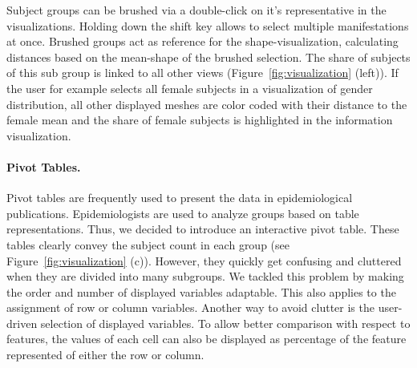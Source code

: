 \documentclass[journal]{style/vgtc} 			          %
\begin{document}
Subject groups can be brushed via a double-click on it's representative in the visualizations.
%
Holding down the shift key allows to select multiple manifestations at once.
%
Brushed groups act as reference for the shape-visualization, calculating distances based on the mean-shape of the brushed selection.
%
The share of subjects of this sub group is linked to all other views (Figure~\ref{fig:visualization} (left)).
%
If the user for example selects all female subjects in a visualization of gender distribution, all other displayed meshes are color coded with their distance to the female mean and the share of female subjects is highlighted in the information visualization.
%

\paragraph{Pivot Tables.}
Pivot tables are frequently used to present the data in epidemiological publications.
%
Epidemiologists are used to analyze groups based on table representations.
%
Thus, we decided to introduce an interactive pivot table.
%
These tables clearly convey the subject count in each group (see Figure~\ref{fig:visualization} (c)).
%
However, they quickly get confusing and cluttered when they are divided into many subgroups.
%
We tackled this problem by making the order and number of displayed variables adaptable.
%
This also applies to the assignment of row or column variables.
%
Another way to avoid clutter is the user-driven selection of displayed variables.
%
To allow better comparison with respect to features, the values of each cell can also be displayed as percentage of the feature represented of either the row or column.
\end{document}
